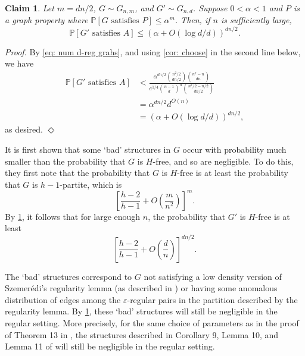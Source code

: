 \documentclass[11pt]{article}
\newenvironment{proofclaim}[1][]%
{\noindent \emph{Proof.} {}{#1}{}}{\hfill
	$\Diamond$\vspace{1em}}
\theoremstyle{plain}
\newtheorem{claim}{Claim}[thm]
\begin{document}
\begin{claim}\label{lem: conversion}
    Let $m = dn/2$, $G \sim G_{n,m}$, and $G' \sim G_{n,d}$. Suppose $0 < \alpha < 1$ and $P$ is a graph property where $\mathbb P[G \text{ satisfies } P] \leq \alpha^{m}$. Then, if  $n$ is sufficiently large, 
    \[
    \mathbb P[G' \text{ satisfies $A$}] \leq (\alpha + O(\log d / d))^{dn/2}.
    \]
\end{claim}

\begin{proofclaim}
    By \cref{eq: num d-reg grahs}, and using \cref{cor: choose} in the second line below, we have 
    \begin{align*}
        \mathbb P[G' \text{ satisfies $A$}] &< \frac{\alpha^{dn/2}{n^2/2 \choose dn/2}\binom{n^2-n}{dn}}{e^{1/4}{n-1 \choose d}^n\binom{n^2/2 - n/2}{dn/2}}\\
        &= \alpha^{dn/2}d^{O(n)}\\
        &= (\alpha + O(\log d/d))^{dn/2},
    \end{align*}
    as desired.
\end{proofclaim}

It is first shown that some `bad' structures in $G$ occur with probability much smaller than the probability that $G$ is $H$-free, and so are negligible. To do this, they first note that the probability that $G$ is $H$-free is at least the probability that $G$ is $h-1$-partite, which is 
\[
\left[\frac{h-2}{h-1} + O\left( \frac{m}{n^2} \right)\right]^m.
\]
By \cref{lem: conversion}, it follows that for large enough $n$, the probability that $G'$ is $H$-free is at least 
\[
\left[\frac{h-2}{h-1} + O\left( \frac{d}{n} \right)\right]^{dn/2}.
\]

The `bad' structures correspond to $G$ not satisfying a low density version of Szemer\'edi's regularity lemma (as described in \cite{kohayakawa1997szemeredi}) or having some anomalous distribution of edges among the $\varepsilon$-regular pairs in the partition described by the regularity lemma. By \cref{lem: conversion}, these `bad' structures will still be negligible in the regular setting. More precisely, for the same choice of parameters as in the proof of Theorem 13 in \cite{luczak2000triangle}, the structures described in Corollary 9, Lemma 10, and Lemma 11 of \cite{luczak2000triangle} will still be negligible in the regular setting. 
\end{document}
